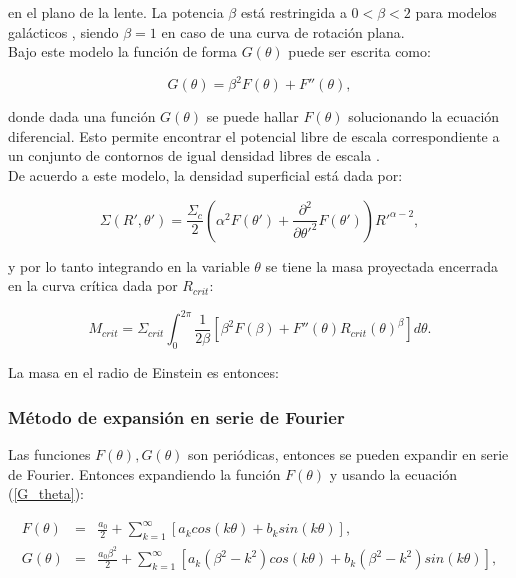 en el plano de la lente. La potencia $\beta$ está restringida a $0<\beta<2$ para modelos galácticos , siendo $\beta=1$ en caso de una curva de rotación plana.\\

Bajo este modelo la función de forma $G(\theta)$ puede ser escrita como:

\begin{equation}
\label{G_theta}
G(\theta) = \beta^2 F(\theta) + F''(\theta), 
\end{equation}

donde dada una función $G(\theta)$ se puede hallar $F(\theta)$ solucionando la ecuación diferencial. Esto permite encontrar el potencial libre de escala correspondiente a un conjunto de contornos de igual densidad libres de escala \cite{EV03}.\\

De acuerdo a este modelo, la densidad superficial está dada por:

\begin{equation}
\Sigma(R', \theta') = \frac{\Sigma_c}{2} \left( \alpha^2 F(\theta ') + \frac{\partial ^2}{\partial \theta '^2} F(\theta ')  \right) R '^{\alpha - 2},
\end{equation}

y por lo tanto integrando en la variable $\theta$ se tiene la masa proyectada encerrada en la curva crítica dada por $R_{crit}$:

\begin{equation}
    M_{crit} =\Sigma_{crit} \int_0^{2\pi} \frac{1}{2\beta} \left[ \beta^2 F(\beta) + F''(\theta) R_{crit}(\theta)^{\beta} \right] d\theta.
\end{equation}

La masa en el radio de Einstein es entonces:




\subsubsection{Método de expansión en serie de Fourier}

Las funciones $F(\theta), G(\theta)$ son periódicas, entonces se pueden expandir en serie de Fourier. Entonces expandiendo la función $F(\theta)$ y usando la ecuación (\ref{G_theta}):

\begin{eqnarray}
\label{Fourier_F}
F(\theta) &=& \frac{a_0}{2} + \sum_{k=1}^{\infty} \left[ a_k cos(k \theta) + b_k sin (k \theta) \right],\\
G(\theta) &=& \frac{a_0 \beta^2}{2} + \sum_{k=1}^{\infty} \left[ a_k (\beta^2-k^2) cos(k \theta) + b_k (\beta^2-k^2) sin (k \theta) \right],
\end{eqnarray}

